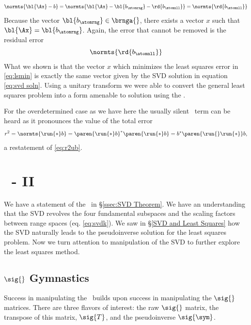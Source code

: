  \begin{equation*}   %
    \normts{ \bl{\Ax} - b } = \normts{ \bl{\Ax} - \bl{b_{\atomrng}} - \rd{b_{\atomnll}} } = \normts{ \rd{b_{\atomnll}} }
  \end{equation*}
Because the vector $\bl{b_{\atomrng}} \in \brnga{}$, there exists a vector $x$ such that $\bl{\Ax} = \bl{b_{\atomrng}}$. Again, the error that cannot be removed is the residual error
  \begin{equation*}   %
    \normts{ \rd{b_{\atomnll}} }
  \end{equation*}
What we shown is that the vector $x$ which minimizes the least squares error in \eqref{eq:lsmin} is exactly the same vector given by the SVD solution in equation \eqref{eq:svd soln}. Using a unitary transform we were able to convert the general least squares problem into a form amenable to solution using the \asvd.

For the overdetermined case as we have here the usually silent \ns \ term can be heard as it pronounces the value of the total error
\begin{equation}
  r^{2} = \normts{ \run{*} b  } = \paren{ \run{*} b  }^{*} \paren{ \run{*} b  } = b^{*} \paren{ \run{}\run{*} } b ,
  \label{eq:r2:a}
\end{equation}
a restatement of \eqref{eq:r2ub}.

\section{\bsvd\ - II}  %
We have a statement of the \asvd \ in \S \ref{ssec:SVD Theorem}. We have an understanding that the SVD revolves the four fundamental subspaces and the scaling factors between range spaces (eq. \eqref{eq:svdk}). We saw in \S \ref{SVD and Least Squares} how the SVD naturally leads to the pseudoinverse solution for the least squares problem. Now we turn attention to manipulation of the SVD to further explore the least squares method.

\subsection{$\sig{}$ Gymnastics}  %
Success in manipulating the \asvd \ builds	upon success in manipulating the $\sig{}$ matrices. There are three flavors of interest: the raw $\sig{}$ matrix, the transpose of this matrix, $\sig{T}$, and the pseudoinverse $\sig{\sym}$.

